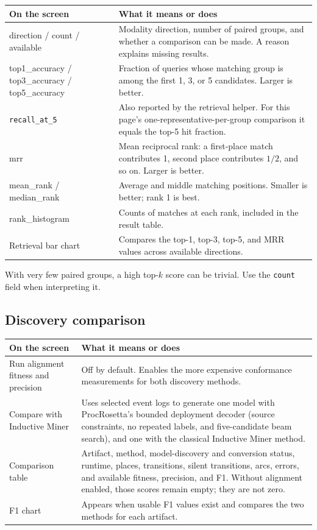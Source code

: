 \documentclass[11pt,a4paper]{article}
\makeatletter
\newcommand{\code}[1]{\nolinkurl{#1}}
\newenvironment{controls}{%
  \small\begin{longtable}{@{}>{\raggedright\arraybackslash}p{.34\linewidth}
    >{\raggedright\arraybackslash}p{.62\linewidth}@{}}
  \toprule\textbf{On the screen} & \textbf{What it means or does}\\\midrule\endhead
  \bottomrule\endfoot
}{\end{longtable}\normalsize}
\makeatother
\begin{document}
\begin{controls}
direction / count / available & Modality direction, number of paired groups,
and whether a comparison can be made. A reason explains missing results.\\
top1\_accuracy / top3\_accuracy / top5\_accuracy & Fraction of queries whose
matching group is among the first 1, 3, or 5 candidates. Larger is better.\\
\code{recall_at_5} & Also reported by the retrieval helper. For this page's
one-representative-per-group comparison it equals the top-5 hit fraction.\\
mrr & Mean reciprocal rank: a first-place match contributes 1, second place
contributes $1/2$, and so on. Larger is better.\\
mean\_rank / median\_rank & Average and middle matching positions. Smaller
is better; rank 1 is best.\\
rank\_histogram & Counts of matches at each rank, included in the result table.\\
Retrieval bar chart & Compares the top-1, top-3, top-5, and MRR values across
available directions.\\
\end{controls}

With very few paired groups, a high top-$k$ score can be trivial. Use the
\code{count} field when interpreting it.

\subsection{Discovery comparison}
\begin{controls}
Run alignment fitness and precision & Off by default. Enables the more
expensive conformance measurements for both discovery methods.\\
Compare with Inductive Miner & Uses selected event logs to generate one model
with ProcRosetta's bounded deployment decoder (source constraints, no repeated
labels, and five-candidate beam search), and one with the classical Inductive
Miner method.\\
Comparison table & Artifact, method, model-discovery and conversion status,
runtime, places, transitions, silent transitions, arcs, errors, and available
fitness, precision, and F1. Without alignment enabled, those scores remain
empty; they are not zero.\\
F1 chart & Appears when usable F1 values exist and compares the two methods
for each artifact.\\
\end{controls}
\end{document}
